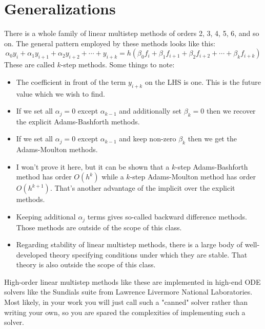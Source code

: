 \documentclass[hidelinks,notitlepage]{book}
\begin{document}
\section{Generalizations}
There is a whole family of linear multistep methods of orders 2, 3, 4, 5, 6, and so on.  The general pattern employed by these methods looks like this:
\begin{equation}
\label{eq:LMMGeneralOrder}
\alpha_0 y_i + \alpha_1 y_{i+1} + \alpha_2 y_{i+2} + \cdots + y_{i+k} =
h \left(\beta_0 f_i + \beta_1 f_{i+1}  + \beta_2 f_{i+2} + \cdots + \beta_{k} f_{i+k}  \right) 
\end{equation}
These are called $k$-step methods.  Some things to note:
\begin{itemize}
	\item The coefficient in front of the term $y_{i+k}$ on the LHS is one.  This is the future value which we wish to find.
	\item If we set all $\alpha_j = 0$ except $\alpha_{k-1}$ and additionally set $\beta_{k}=0$ then we recover the explicit Adams-Bashforth methods.
	\item If we set all $\alpha_j = 0$ except $\alpha_{k-1}$ and keep non-zero $\beta_{k}$ then we get the Adams-Moulton methods.
	\item I won't prove it here, but it can be shown that a $k$-step Adams-Bashforth method has order $O(h^k)$ while a $k$-step Adams-Moulton method has order $O(h^{k+1})$.  That's another advantage of the implicit over the explicit methods.
	\item Keeping additional $\alpha_j$ terms gives so-called backward difference methods.  Those methods are outside of the scope of this class.
	\item Regarding stability of linear multistep methods, there is a large body of well-developed theory specifying conditions under which they are stable.  That theory is also outside the scope of this class.
\end{itemize}
High-order linear multistep methods like these are implemented in high-end ODE solvers like the Sundials suite from Lawrence Livermore National Laboratories.  Most likely, in your work you will just call such a "canned" solver rather than writing your own, so you are spared the complexities of implementing such a solver.

\end{document}

